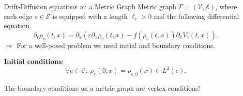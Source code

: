 \documentclass[9pt]{beamer}
\begin{document}
\begin{frame}{Drift-Diffusion equations on a Metric Graph}
    Metric graph $\Gamma =  \left( \mathcal{V}, \mathcal{E} \right) $, where each edge $e \in \mathcal{E}$ is equipped with a length $\ell_e > 0$ and the following differential equation
    \begin{equation*} 
        \partial_t \rho_e  \left( t,x \right)  = \partial_x  \left( \varepsilon \partial_x \rho_e  \left( t,x \right)  - f \left( \rho_e  \left( t,x \right)   \right)  \partial_x V_e  \left( t,x \right)  \right).
    \end{equation*}
    $\Rightarrow$ For a well-posed problem we need initial and boundary conditions.

    \vspace{5mm}

    \textbf{Initial conditions}:
    \begin{equation*}
        \forall e \in \mathcal{E} \colon \; \rho_e \left( 0,x \right)  = \rho_{e, 0} \left( x \right) \in L^2 \left( e \right).
    \end{equation*}

    \vspace{3mm}

    The boundary conditions on a metric graph are vertex conditions!
\end{frame}
\end{document}
